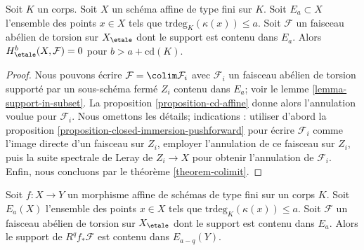 \begin{lemma}
\label{lemma-interlude-II}
Soit $K$ un corps. Soit $X$ un schéma affine de type fini sur $K$.
Soit $E_a \subset X$ l'ensemble des points
$x \in X$ tels que $\text{trdeg}_K(\kappa(x)) \leq a$.
Soit $\mathcal{F}$ un faisceau abélien de torsion sur $X_\etale$
dont le support est contenu dans $E_a$. Alors
$H^b_\etale(X, \mathcal{F}) = 0$ pour $b > a + \text{cd}(K)$.
\end{lemma}

\begin{proof}
Nous pouvons écrire $\mathcal{F} = \colim \mathcal{F}_i$
avec $\mathcal{F}_i$ un faisceau abélien de torsion
supporté par un sous-schéma fermé $Z_i$ contenu dans $E_a$; voir le
lemme \ref{lemma-support-in-subset}.
La proposition \ref{proposition-cd-affine} donne alors
l'annulation voulue pour $\mathcal{F}_i$. Nous omettons les détails;
indications : utiliser d'abord la proposition \ref{proposition-closed-immersion-pushforward}
pour écrire $\mathcal{F}_i$ comme l'image directe d'un faisceau sur $Z_i$,
employer l'annulation de ce faisceau sur $Z_i$, puis la
suite spectrale de Leray de $Z_i \to X$ pour obtenir l'annulation
de $\mathcal{F}_i$. Enfin, nous
concluons par le théorème \ref{theorem-colimit}.
\end{proof}

\begin{lemma}
\label{lemma-interlude-I}
Soit $f : X \to Y$ un morphisme affine de schémas de type
fini sur un corps $K$. Soit $E_a(X)$ l'ensemble des points $x \in X$
tels que $\text{trdeg}_K(\kappa(x)) \leq a$.
Soit $\mathcal{F}$ un faisceau abélien de torsion sur $X_\etale$
dont le support est contenu dans $E_a$. Alors
le support de $R^qf_*\mathcal{F}$ est contenu dans
$E_{a - q}(Y)$.
\end{lemma}

